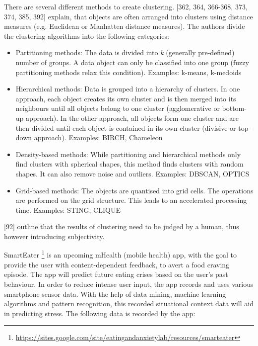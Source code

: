 \documentclass[12pt,a4paper]{article}
\begin{document}
There are several different methods to create clustering. \textcite{han2011data}[362, 364, 366-368, 373, 374, 385, 392] explain, that objects are often arranged into clusters using distance measures (e.g. Euclidean or Manhatten distance measures). The authors divide the clustering algorithms into the following categories:
\begin{itemize}
	\item Partitioning methods: The data is divided into \textit{k} (generally pre-defined) number of groups. A data object can only be classified into one group (fuzzy partitioning methods relax this condition). Examples: k-means, k-medoids
	\item Hierarchical methods: Data is grouped into a hierarchy of clusters. In one approach, each object creates its own cluster and is then merged into its neighbours until all objects belong to one cluster (agglomerative or bottom-up approach). In the other approach, all objects form one cluster and are then divided until each object is contained in its own cluster (divisive or top-down approach). Examples: BIRCH, Chameleon
	\item Density-based methods: While partitioning and hierarchical methods only find clusters with spherical shapes, this method finds clusters with random shapes. It can also remove noise and outliers. Examples: DBSCAN, OPTICS
	\item Grid-based methods: The objects are quantised into grid cells. The operations are performed on the grid structure. This leads to an accelerated processing time. Examples: STING, CLIQUE
\end{itemize}
\textcite{feldman2007text}[92] outline that the results of clustering need to be judged by a human, thus however introducing subjectivity.

SmartEater \footnote{\url{https://sites.google.com/site/eatingandanxietylab/resources/smarteater}} is an upcoming mHealth (mobile health) app, with the goal to provide the user with content-dependent feedback, to avert a food craving episode. The app will predict future eating crises based on the user's past behaviour. In order to reduce intense user input, the app records and uses various smartphone sensor data.  With the help of data mining, machine learning algorithms and pattern recognition, this recorded situational context data will aid in predicting stress. The following data is recorded by the app:
\end{document}
